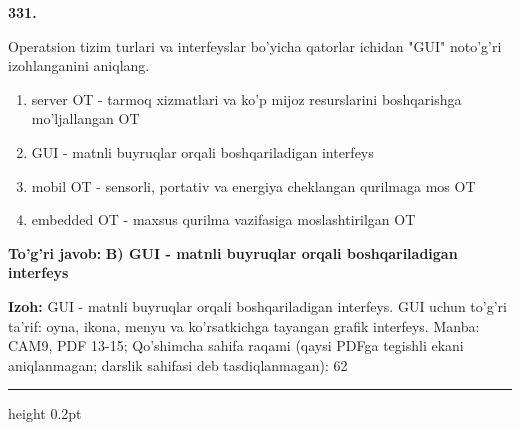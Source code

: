 \documentclass[10pt,a4paper]{article}
\begin{document}
{\bfseries\sffamily\color{ink} 331.}
\par
Operatsion tizim turlari va interfeyslar bo'yicha qatorlar ichidan "GUI" noto'g'ri izohlanganini aniqlang.
\begin{enumerate}[label=\Alph*),leftmargin=9mm]
\item server OT - tarmoq xizmatlari va ko'p mijoz resurslarini boshqarishga mo'ljallangan OT
\item GUI - matnli buyruqlar orqali boshqariladigan interfeys
\item mobil OT - sensorli, portativ va energiya cheklangan qurilmaga mos OT
\item embedded OT - maxsus qurilma vazifasiga moslashtirilgan OT
\end{enumerate}
\begin{tcolorbox}[enhanced,breakable,colback=teal!4,colframe=teal!60!black,boxrule=0.45pt,arc=1.2mm,left=2.7mm,right=2.7mm,top=1.8mm,bottom=1.8mm,before skip=2mm,after skip=2mm]
{\bfseries\sffamily\color{teal}To'g'ri javob:} \textbf{B) GUI - matnli buyruqlar orqali boshqariladigan interfeys}
\par\smallskip
{\bfseries Izoh:} GUI - matnli buyruqlar orqali boshqariladigan interfeys. GUI uchun to'g'ri ta'rif: oyna, ikona, menyu va ko'rsatkichga tayangan grafik interfeys. Manba: CAM9, PDF 13-15; Qo'shimcha sahifa raqami (qaysi PDFga tegishli ekani aniqlanmagan; darslik sahifasi deb tasdiqlanmagan): 62
\end{tcolorbox}
\vspace{2mm}\hrule height 0.2pt\vspace{3mm}
\end{document}
